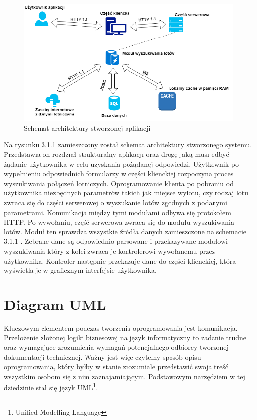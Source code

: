\documentclass[12pt, twoside]{report}
\begin{document}
\begin{figure}[!ht]
\centering
\includegraphics[scale=0.60, keepaspectratio]{architecure_diagram.png}
\caption{Schemat architektury stworzonej aplikacji}
\label{fig:architecure_diagram}
\end{figure}

\newpage
Na rysunku 3.1.1 zamieszczony został schemat architektury stworzonego systemu. Przedstawia on rozdział strukturalny aplikacji oraz drogę jaką musi odbyć żądanie użytkownika w celu uzyskania pożądanej odpowiedzi. Użytkownik po wypełnieniu odpowiednich formularzy w części klienckiej rozpoczyna proces wyszukiwania połączeń lotniczych. Oprogramowanie klienta po pobraniu od użytkownika niezbędnych parametrów takich jak miejsce wylotu, czy rodzaj lotu zwraca się do części serwerowej o wyszukanie lotów zgodnych z podanymi parametrami. Komunikacja między tymi modułami odbywa się protokołem HTTP. Po wywołaniu, część serwerowa zwraca się do modułu wyszukiwania lotów. Moduł ten sprawdza wszystkie źródła danych zamieszczone na schemacie 3.1.1 . Zebrane dane są odpowiednio parsowane i przekazywane modułowi wyszukiwania który z kolei zwraca je kontrolerowi wywołanemu przez użytkownika. Kontroler następnie przekazuje dane do części klienckiej, która wyświetla je w  graficznym interfejsie użytkownika. 
\section{Diagram UML}
Kluczowym elementem podczas tworzenia oprogramowania jest komunikacja. Przełożenie złożonej logiki biznesowej na język informatyczny to zadanie trudne oraz wymagające zrozumienia wymagań potencjalnego odbiorcy tworzonej dokumentacji technicznej. Ważny jest więc czytelny sposób opisu oprogramowania, który byłby w stanie zrozumiale przedstawić swoja treść wszystkim osobom się z nim zaznajamiającym. Podstawowym narzędziem w tej dziedzinie stał się język UML\footnote{Unified Modelling Language}.\cite{uml} \\
\end{document}
